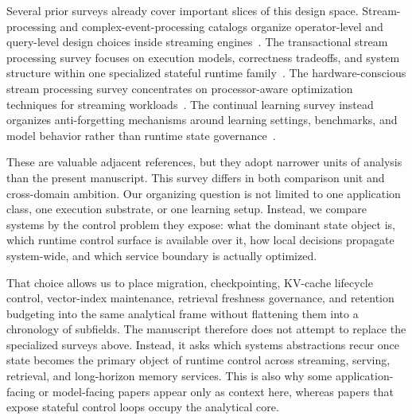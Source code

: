 \documentclass[acmsmall,screen,review]{acmart}
\begin{document}
Several prior surveys already cover important slices of this design space. Stream-processing and complex-event-processing catalogs organize operator-level and query-level design choices inside streaming engines~\cite{hirzel2014catalog,cugola2012processing}. The transactional stream processing survey focuses on execution models, correctness tradeoffs, and system structure within one specialized stateful runtime family~\cite{zhang2024survey}. The hardware-conscious stream processing survey concentrates on processor-aware optimization techniques for streaming workloads~\cite{zhang2020hardware}. The continual learning survey instead organizes anti-forgetting mechanisms around learning settings, benchmarks, and model behavior rather than runtime state governance~\cite{delange2021survey}.

These are valuable adjacent references, but they adopt narrower units of analysis than the present manuscript. This survey differs in both comparison unit and cross-domain ambition. Our organizing question is not limited to one application class, one execution substrate, or one learning setup. Instead, we compare systems by the control problem they expose: what the dominant state object is, which runtime control surface is available over it, how local decisions propagate system-wide, and which service boundary is actually optimized.

That choice allows us to place migration, checkpointing, KV-cache lifecycle control, vector-index maintenance, retrieval freshness governance, and retention budgeting into the same analytical frame without flattening them into a chronology of subfields. The manuscript therefore does not attempt to replace the specialized surveys above. Instead, it asks which systems abstractions recur once state becomes the primary object of runtime control across streaming, serving, retrieval, and long-horizon memory services. This is also why some application-facing or model-facing papers appear only as context here, whereas papers that expose stateful control loops occupy the analytical core.
\end{document}
